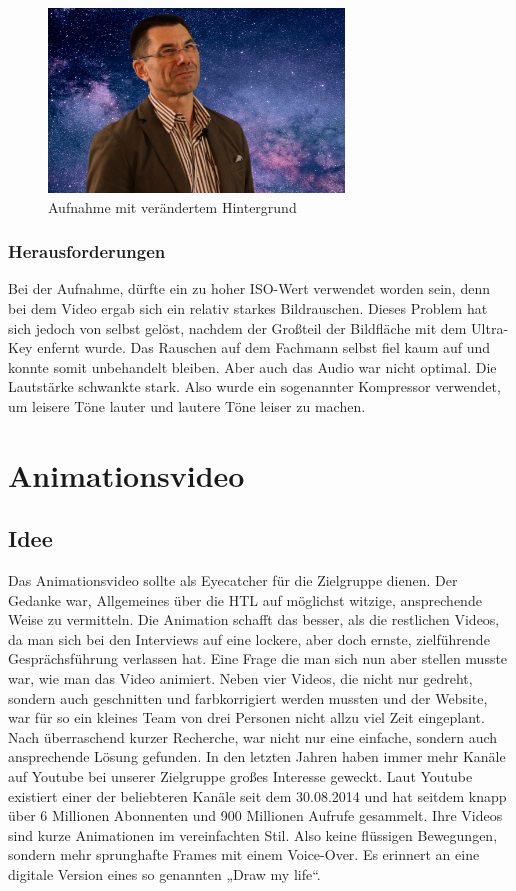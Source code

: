 \begin{figure}[H] 
  \centering
     \includegraphics[width=0.7\textwidth]{video_abb2.png}
  \caption{Aufnahme mit verändertem Hintergrund}
\end{figure}

\subsection{Herausforderungen}
Bei der Aufnahme, dürfte ein zu hoher ISO-Wert verwendet worden sein, denn bei dem Video ergab sich ein relativ starkes Bildrauschen.\cite{iso} Dieses Problem hat sich jedoch von selbst gelöst, nachdem der Großteil der Bildfläche mit dem Ultra-Key enfernt wurde. Das Rauschen auf dem Fachmann selbst fiel kaum auf und konnte somit unbehandelt bleiben. Aber auch das Audio war nicht optimal. Die Lautstärke schwankte stark. Also wurde ein sogenannter Kompressor verwendet, um leisere Töne lauter und lautere Töne leiser zu machen.\cite{kompressor}


\chapter{Animationsvideo}
\section{Idee}
\renewcommand{\kapitelautor}{Autor: Niklas Kienreich}
Das Animationsvideo sollte als Eyecatcher für die Zielgruppe dienen. Der Gedanke war, Allgemeines über die HTL auf möglichst witzige, ansprechende Weise zu vermitteln. Die Animation schafft das besser, als die restlichen Videos, da man sich bei den Interviews auf eine lockere, aber doch ernste, zielführende Gesprächsführung verlassen hat. Eine Frage die man sich nun aber stellen musste war, wie man das Video animiert. Neben vier Videos, die nicht nur gedreht, sondern auch geschnitten und farbkorrigiert werden mussten und der Website, war für so ein kleines Team von drei Personen nicht allzu viel Zeit eingeplant. Nach überraschend kurzer Recherche, war nicht nur eine einfache, sondern auch ansprechende Lösung gefunden. In den letzten Jahren haben immer mehr Kanäle auf Youtube bei unserer Zielgruppe großes Interesse geweckt. Laut Youtube existiert einer der beliebteren Kanäle seit dem 30.08.2014 und hat seitdem knapp über 6 Millionen Abonnenten und 900 Millionen Aufrufe gesammelt.\cite{channel} Ihre Videos sind kurze Animationen im vereinfachten Stil. Also keine flüssigen Bewegungen, sondern mehr sprunghafte Frames mit einem Voice-Over. Es erinnert an eine digitale Version eines so genannten „Draw my life“.
